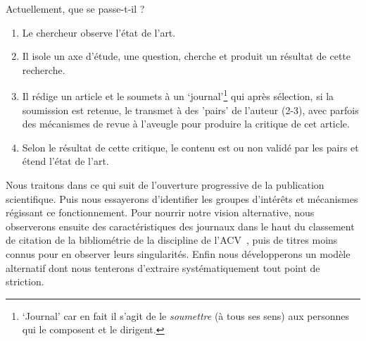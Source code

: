 Actuellement, que se passe-t-il ?
\begin{enumerate}[label=\roman*]
\item Le chercheur observe l'état de l'art.
\item Il isole un axe d'étude, une question, cherche et produit un résultat de cette recherche.
\item Il rédige un article et le soumets à un `journal'\footnote{`Journal' car en fait il s'agit de le \emph{soumettre} (à tous ses sens) aux personnes qui le composent et le dirigent.} qui après sélection, si la soumission est retenue, le transmet à des 'pairs' de l'auteur (2-3), avec parfois des mécanismes de revue à l'aveugle pour produire la critique de cet article.
\item Selon le résultat de cette critique, le contenu est ou non validé par les pairs et étend l'état de l'art.
\end{enumerate}

Nous traitons dans ce qui suit de l'ouverture progressive de la publication scientifique.
Puis nous essayerons d'identifier les groupes d'intérêts et mécanismes régissant ce fonctionnement.
Pour nourrir notre vision alternative, nous observerons ensuite des caractéristiques des journaux dans le haut du classement de citation de la bibliométrie de la discipline de l'\gls{ACV}~\cite{chen_bibliometric_2014}, puis de titres moins connus pour en observer leurs singularités.
Enfin nous développerons un modèle alternatif dont nous tenterons d'extraire systématiquement tout point de striction.


